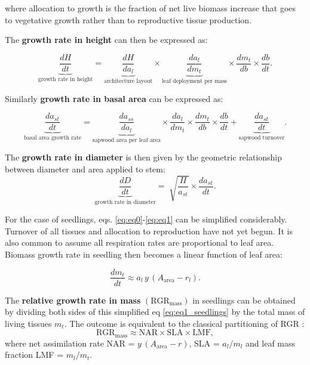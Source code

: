 \documentclass[a4paper,11pt]{article}
\begin{document}
\begin{appendices}
where allocation to growth is the fraction of net live biomass increase that goes to vegetative growth rather than to reproductive tissue production.

The \textbf{growth rate in height} can then be expressed as:

\begin{equation}\label{eq:eq2}
\underbrace{\frac{dH}{dt}}_{\text{growth rate in height}} = \underbrace{\frac{dH}{da_{l}}}_{\text{architecture layout}} \times \underbrace{{\frac{da_{l}}{dm_{t}}}}_{\text{leaf deployment per mass}} \times {\frac{dm_t}{db}} \times {\frac{db}{dt}}.
\end{equation}

Similarly \textbf{growth rate in basal area} can be expressed as:

\begin{equation}\label{eq:eq3}
\underbrace{{\frac{da_{st}}{dt}}}_{\text{basal area growth rate}} = \underbrace{\frac{da_{ss}}{da_{l}}}_{\text{sapwood area per leaf area}} \times {\frac{da_{l}}{dm_{t}}} \times  {\frac{dm_t}{db}} \times {\frac{db}{dt}} +  \underbrace{ \frac{da_{st}}{dt}}_{\text{sapwood turnover}}.
\end{equation}

The \textbf{growth rate in diameter} is then given by the geometric relationship between diameter and area applied to stem:
\begin{equation}\label{eq:eq4}
\underbrace{\frac{dD}{dt}}_{\text{growth rate in diameter}} = \sqrt[]{\frac{\Pi}{a_{st}}} \times {\frac{da_{st}}{dt}}.
\end{equation}

For the case of seedlings, eqs. \ref{eq:eq0}-\ref{eq:eq1} can be simplified considerably. Turnover of all tissues and allocation to reproduction have not yet begun. It is also common to assume all respiration rates are proportional to leaf area. Biomass growth rate in seedling then becomes a linear function of leaf area:

\begin{equation}\label{eq:eq1_seedlings}
{\frac{dm_t}{dt}}  \approx  a_{l} \, y \, (A_{\textrm{area}} - r_{l}).
\end{equation}

The \textbf{relative growth rate in mass} $(\textrm{RGR}_{\textrm{mass}})$ in seedlings can be obtained by dividing both sides of this simplified eq \ref{eq:eq1_seedlings} by the total mass of living tissues $m_{t}$. The outcome is equivalent to the classical partitioning of RGR \citep{Lambers:1992bj, Cornelissen:1998ta}:
\begin{equation}\label{eq:eq1_seedlings_RGR}
\textrm{RGR}_{\textrm{mass}}  \approx \textrm{NAR} \times  \textrm{SLA} \times  \textrm{LMF},
\end{equation}
 where net assimilation rate NAR = $y \, (A_{\textrm{area}} - r)$, SLA = $a_{l}/ m_{l}$ and leaf mass fraction LMF = $m_{l}/ m_{t}$.



\end{appendices}
\end{document}
